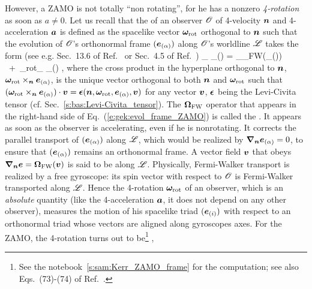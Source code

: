 However, a ZAMO is not totally ``non rotating'', for he has a nonzero \emph{4-rotation}
as soon as $a\neq 0$. Let us recall that
the  of an observer $\mathscr{O}$
of 4-velocity $\bm{n}$ and 4-acceleration $\bm{a}$
is defined as the spacelike vector $\bm{\omega}_{\rm rot}$ orthogonal to $\bm{n}$ such that the evolution of $\mathscr{O}$'s orthonormal frame
$(\bm{e}_{(\alpha)})$ along $\mathscr{O}$'s worldline $\mathscr{L}$ takes the form
(see e.g. Sec.~13.6 of Ref.~\cite{MisneTW73} or Sec.~4.5 of Ref.~\cite{Gourg13})
\be \label{e:gek:evol_frame_ZAMO}
    \wnab_{} _{(\alpha)} = _{\w{\Omega}_{\rm FW}(_{(\alpha)})}
       \  +\  \w{\omega}_{\rm rot}\times_{} _{(\alpha)} ,
\ee
where the cross product in the hyperplane orthogonal to $\bm{n}$, $\bm{\omega}_{\rm rot}\times_{\bm{n}} \bm{e}_{(\alpha)}$, is the unique vector orthogonal to both $\bm{n}$
and $\bm{\omega}_{\rm rot}$ such that
$(\bm{\omega}_{\rm rot}\times_{\bm{n}} \bm{e}_{(\alpha)})\cdot\bm{v} = \bm{\epsilon}(\bm{n}, \bm{\omega}_{\rm rot}, \bm{e}_{(\alpha)}, \bm{v})$ for any vector $\bm{v}$, $\bm{\epsilon}$ being the Levi-Civita tensor (cf. Sec.~\ref{s:bas:Levi-Civita_tensor}).
The $\bm{\Omega}_{\rm FW}$ operator that appears
in the right-hand side of Eq.~(\ref{e:gek:evol_frame_ZAMO}) is called the . It appears as soon as the observer is accelerating, even if he is nonrotating.
It corrects the parallel transport of $(\bm{e}_{(\alpha)})$ along $\mathscr{L}$, which would be realized by
$\bm{\nabla}_{\bm{n}} \bm{e}_{(\alpha)} = 0$, to ensure that $(\bm{e}_{(\alpha)})$ remains an orthonormal
frame. A vector field $\bm{v}$ that obeys $\bm{\nabla}_{\bm{n}} \bm{e} = \bm{\Omega}_{\rm FW}(\bm{v})$ is said
to be  along $\mathscr{L}$. Physically, Fermi-Walker transport is realized by a free gyroscope: its spin vector with respect to $\mathscr{O}$
is Fermi-Walker transported along $\mathscr{L}$. Hence the 4-rotation $\bm{\omega}_{\rm rot}$ of an observer, which is an \emph{absolute}
quantity (like the 4-acceleration $\bm{a}$, it does not depend on any other observer), measures the motion of
his spacelike triad $(\bm{e}_{(i)})$ with respect to an orthonormal triad whose vectors are aligned along
gyroscopes axes. For the ZAMO, the 4-rotation turns out to be\footnote{See the notebook~\ref{s:sam:Kerr_ZAMO_frame} for the computation; see also
Eqs.~(73)-(74) of Ref.~\cite{Semer93}.}
\be \label{e:ker:rot_ZAMO}
   ,
